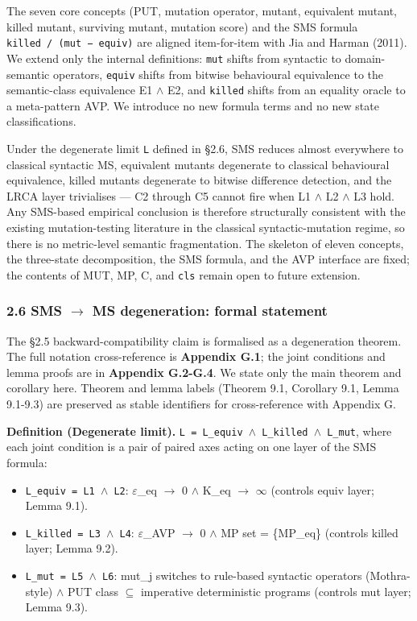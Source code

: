 \documentclass[review,12pt,authoryear]{elsarticle}
\providecommand{\tightlist}{\setlength{\itemsep}{0pt}\setlength{\parskip}{0pt}}
\begin{document}
The seven core concepts (PUT, mutation operator, mutant, equivalent
mutant, killed mutant, surviving mutant, mutation score) and the SMS
formula
\texttt{\textbar{}killed\textbar{}\ /\ (\textbar{}mut\textbar{}\ −\ \textbar{}equiv\textbar{})}
are aligned item-for-item with Jia and Harman (2011). We extend only the
internal definitions: \texttt{mut} shifts from syntactic to
domain-semantic operators, \texttt{equiv} shifts from bitwise
behavioural equivalence to the semantic-class equivalence E1 $\wedge$ E2, and
\texttt{killed} shifts from an equality oracle to a meta-pattern AVP. We
introduce no new formula terms and no new state classifications.

Under the degenerate limit \texttt{L} defined in §2.6, SMS reduces
almost everywhere to classical syntactic MS, equivalent mutants
degenerate to classical behavioural equivalence, killed mutants
degenerate to bitwise difference detection, and the LRCA layer
trivialises --- C2 through C5 cannot fire when L1 $\wedge$ L2 $\wedge$ L3 hold. Any
SMS-based empirical conclusion is therefore structurally consistent with
the existing mutation-testing literature in the classical
syntactic-mutation regime, so there is no metric-level semantic
fragmentation. The skeleton of eleven concepts, the three-state
decomposition, the SMS formula, and the AVP interface are fixed; the
contents of MUT, MP, C, and \texttt{cls} remain open to future
extension.

\subsubsection{2.6 SMS $\to$ MS degeneration: formal
statement}\label{sms-ms-degeneration-formal-statement}

The §2.5 backward-compatibility claim is formalised as a degeneration
theorem. The full notation cross-reference is \textbf{Appendix G.1}; the
joint conditions and lemma proofs are in \textbf{Appendix G.2-G.4}. We
state only the main theorem and corollary here. Theorem and lemma labels
(Theorem 9.1, Corollary 9.1, Lemma 9.1-9.3) are preserved as stable
identifiers for cross-reference with Appendix G.

\textbf{Definition (Degenerate limit).}
\texttt{L\ =\ L\_equiv\ $\wedge$\ L\_killed\ $\wedge$\ L\_mut}, where each joint
condition is a pair of paired axes acting on one layer of the SMS
formula:

\begin{itemize}
\tightlist
\item
  \texttt{L\_equiv\ =\ L1\ $\wedge$\ L2}: $\varepsilon$\_eq $\to$ 0 $\wedge$ K\_eq $\to$ $\infty$ (controls equiv
  layer; Lemma 9.1).
\item
  \texttt{L\_killed\ =\ L3\ $\wedge$\ L4}: $\varepsilon$\_AVP $\to$ 0 $\wedge$ MP set = \{MP\_eq\}
  (controls killed layer; Lemma 9.2).
\item
  \texttt{L\_mut\ =\ L5\ $\wedge$\ L6}: mut\_j switches to rule-based syntactic
  operators (Mothra-style) $\wedge$ PUT class $\subseteq$ imperative deterministic
  programs (controls mut layer; Lemma 9.3).
\end{itemize}
\end{document}

